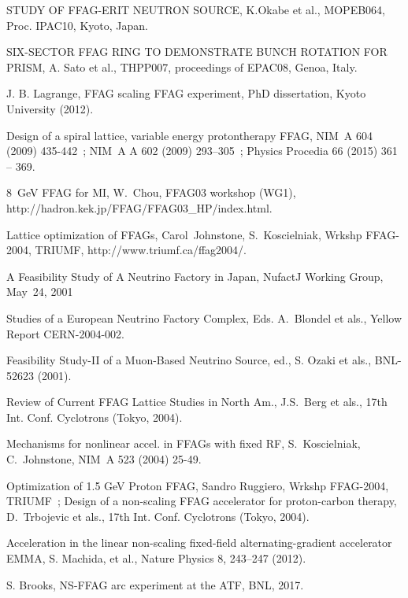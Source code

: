\documentclass[12pt]{article}
\begin{document}
\begin{thebibliography}{99}
 STUDY OF FFAG-ERIT NEUTRON SOURCE, 
K.Okabe et al.,  MOPEB064,  Proc. IPAC10, Kyoto, Japan. 

\clearpage

SIX-SECTOR FFAG RING TO DEMONSTRATE BUNCH ROTATION FOR PRISM, 
A. Sato et al., THPP007, proceedings of EPAC08, Genoa, Italy.


 J. B. Lagrange, FFAG scaling FFAG experiment, 
PhD dissertation, Kyoto University (2012).



 Design of a spiral lattice, variable energy protontherapy FFAG, 
 NIM~A 604 (2009) 435-442~; NIM~A  A 602 (2009) 293–305~; 
Physics Procedia 66 (2015) 361 – 369.

  8~GeV FFAG for MI, W.~Chou, FFAG03 workshop (WG1), 
http://hadron.kek.jp/FFAG/FFAG03\_HP/index.html. 

 Lattice optimization of FFAGs, Carol~Johnstone, S.~Koscielniak, Wrkshp FFAG-2004, 
TRIUMF, http://www.triumf.ca/ffag2004/. 

 A Feasibility Study of A Neutrino Factory in Japan, NufactJ Working Group, May~24, 2001

 Studies of a European Neutrino Factory Complex, Eds. A.~Blondel et als., 
Yellow Report CERN-2004-002. 

 Feasibility Study-II of a Muon-Based Neutrino Source, ed., S. Ozaki et als., 
BNL-52623 (2001). 

 Review of Current FFAG Lattice Studies in North Am., J.S.~Berg et als., 
17th Int. Conf. Cyclotrons (Tokyo, 2004). 

 Mechanisms for nonlinear accel. in FFAGs with  fixed RF, 
 S.~Koscielniak, C.~Johnstone, NIM~A 523 (2004) 25-49. 

 Optimization of 1.5 GeV Proton FFAG, 
Sandro Ruggiero, Wrkshp FFAG-2004, TRIUMF~; 
Design of a non-scaling FFAG accelerator for proton-carbon therapy, D.~Trbojevic et als., 
17th Int. Conf. Cyclotrons (Tokyo, 2004). 

 Acceleration in the linear non-scaling fixed-field alternating-gradient accelerator EMMA, 
    S. Machida,	et al., Nature Physics 8, 243–247 (2012).

  S. Brooks, NS-FFAG arc experiment at the ATF, BNL, 2017. 


\end{thebibliography}
\end{document}
